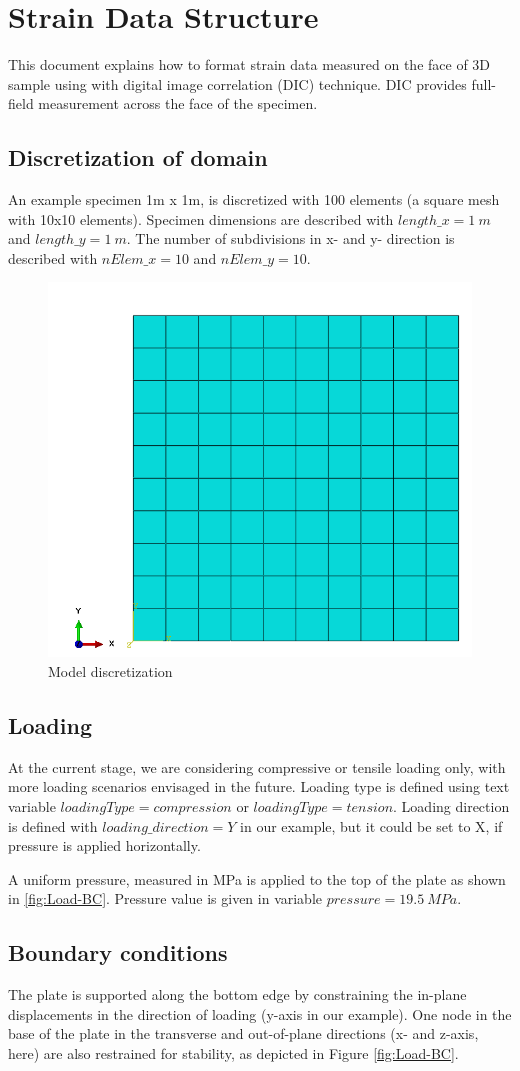 \documentclass[preprint,12pt,3p]{elsarticle}
\begin{document}

\section{Strain Data Structure}
This document explains how to format strain data measured on the face of 3D sample using with digital image correlation (DIC) technique. DIC provides  full-field measurement across the face of the specimen.

\subsection{Discretization of domain}
An example specimen 1m x 1m, is discretized with 100 elements (a square mesh with 10x10 elements). Specimen dimensions are described with $ length\_x = 1 \: m $ and $length\_y = 1 \: m $. The number of subdivisions in x- and y- direction is described with $ nElem\_x = 10 $ and $ nElem\_y = 10$.

\begin{figure} [H]
\centering
\includegraphics[width=0.40\linewidth]{images/Mesh.png}
\caption{Model discretization}
 \label{fig: Mesh}
\end{figure}

\subsection{Loading}
At the current stage, we are considering compressive or tensile loading only, with more loading scenarios envisaged in the future. Loading type is defined using text variable $ loadingType = compression $ or $loadingType = tension$. Loading direction is defined with $loading\_direction = Y$ in our example, but it could be set to X, if pressure is applied horizontally. 

A uniform pressure, measured in MPa is applied to the top of the plate as shown in \ref{fig:Load-BC}. Pressure value is given in variable $pressure = 19.5 \: MPa$.

\subsection{Boundary conditions}
The plate is supported along the bottom edge by constraining the in-plane displacements in the direction of loading (y-axis in our example). One node in the base of the plate in the transverse and out-of-plane directions (x- and z-axis, here) are also restrained for stability, as depicted in Figure \ref{fig:Load-BC}. 
\end{document}
